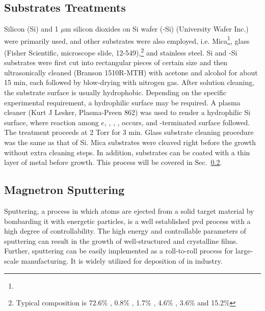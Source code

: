 \subsection{Substrates Treatments}\label{ch2sub}

Silicon (Si) and 1 $\mu$m silicon dioxides on Si wafer (-Si) (University Wafer Inc.) were primarily used, and other substrates were also employed, i.e. Mica\footnote{}, glass (Fisher Scientific, microscope slide, 12-549),\footnote{Typical composition is 72.6\% , 0.8\% , 1.7\% , 4.6\% , 3.6\%  and 15.2\% } and stainless steel. Si and -Si substrates were first cut into rectangular pieces of certain size and then ultrasonically cleaned (Branson 1510R-MTH) with acetone and alcohol for about 15 min, each followed by blow-drying with nitrogen gas. After solution cleaning, the substrate surface is usually hydrophobic. Depending on the specific experimental requirement, a hydrophilic surface may be required. A plasma cleaner (Kurt J Lesker, Plasma-Preen 862) was used to render a hydrophilic Si surface, where reaction among $e$, , , , occurs, and -terminated surface followed.\cite{Habib2010} The treatment proceeds at 2 Torr  for 3 min. Glass substrate cleaning procedure was the same as that of Si. Mica substrates were cleaved right before the growth without extra cleaning steps. In addition, substrates can be coated with a thin layer of metal before growth. This process will be covered in Sec.~\ref{sec:mag}.

\subsection{Magnetron Sputtering}\label{sec:mag}
Sputtering, a process in which atoms are ejected from a solid target material by bombarding it with energetic particles, is a well established \gls{pvd} process with a high degree of controllability. The high energy and controllable parameters of sputtering can result in the growth of well-structured and crystalline films. Further, sputtering can be easily implemented as a roll-to-roll process for large-scale manufacturing. It is widely utilized for deposition of  in industry.

